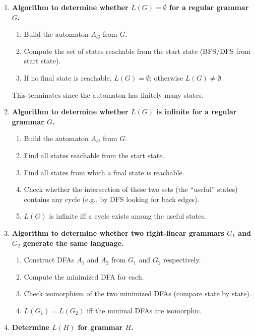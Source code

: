 \begin{enumerate}[{8.}1. ]
\item \textbf{Algorithm to determine whether $L(G) = \emptyset$ for a regular grammar $G$.}

\begin{enumerate}
\item Build the automaton $A_G$ from $G$.
\item Compute the set of states reachable from the start state (BFS/DFS from start state).
\item If no final state is reachable, $L(G) = \emptyset$; otherwise $L(G) \neq \emptyset$.
\end{enumerate}
This terminates since the automaton has finitely many states.

\item \textbf{Algorithm to determine whether $L(G)$ is infinite for a regular grammar $G$.}

\begin{enumerate}
\item Build the automaton $A_G$ from $G$.
\item Find all states reachable from the start state.
\item Find all states from which a final state is reachable.
\item Check whether the intersection of these two sets (the ``useful'' states) contains any cycle (e.g., by DFS looking for back edges).
\item $L(G)$ is infinite iff a cycle exists among the useful states.
\end{enumerate}

\item \textbf{Algorithm to determine whether two right-linear grammars $G_1$ and $G_2$ generate the same language.}

\begin{enumerate}
\item Construct DFAs $A_1$ and $A_2$ from $G_1$ and $G_2$ respectively.
\item Compute the minimized DFA for each.
\item Check isomorphism of the two minimized DFAs (compare state by state).
\item $L(G_1) = L(G_2)$ iff the minimal DFAs are isomorphic.
\end{enumerate}

\item \textbf{Determine $L(H)$ for grammar $H$.}


\end{enumerate}
